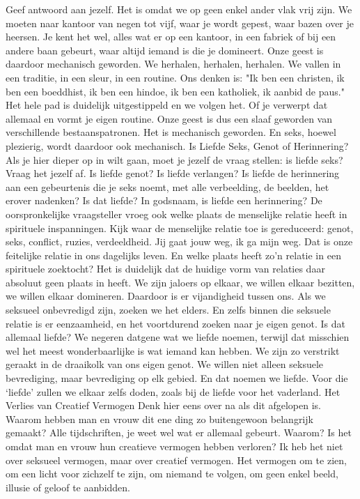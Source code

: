Geef antwoord aan jezelf. Het is omdat we op geen enkel ander vlak vrij zijn. We moeten naar kantoor van negen tot vijf, waar je wordt gepest, waar bazen over je heersen. Je kent het wel, alles wat er op een kantoor, in een fabriek of bij een andere baan gebeurt, waar altijd iemand is die je domineert.
Onze geest is daardoor mechanisch geworden. We herhalen, herhalen, herhalen. We vallen in een traditie, in een sleur, in een routine. Ons denken is: "Ik ben een christen, ik ben een boeddhist, ik ben een hindoe, ik ben een katholiek, ik aanbid de paus." Het hele pad is duidelijk uitgestippeld en we volgen het. Of je verwerpt dat allemaal en vormt je eigen routine. Onze geest is dus een slaaf geworden van verschillende bestaanspatronen. Het is mechanisch geworden.
En seks, hoewel plezierig, wordt daardoor ook mechanisch.
Is Liefde Seks, Genot of Herinnering?
Als je hier dieper op in wilt gaan, moet je jezelf de vraag stellen: is liefde seks? Vraag het jezelf af. Is liefde genot? Is liefde verlangen? Is liefde de herinnering aan een gebeurtenis die je seks noemt, met alle verbeelding, de beelden, het erover nadenken? Is dat liefde? In godsnaam, is liefde een herinnering?
De oorspronkelijke vraagsteller vroeg ook welke plaats de menselijke relatie heeft in spirituele inspanningen. Kijk waar de menselijke relatie toe is gereduceerd: genot, seks, conflict, ruzies, verdeeldheid. Jij gaat jouw weg, ik ga mijn weg. Dat is onze feitelijke relatie in ons dagelijks leven. En welke plaats heeft zo’n relatie in een spirituele zoektocht?
Het is duidelijk dat de huidige vorm van relaties daar absoluut geen plaats in heeft. We zijn jaloers op elkaar, we willen elkaar bezitten, we willen elkaar domineren. Daardoor is er vijandigheid tussen ons. Als we seksueel onbevredigd zijn, zoeken we het elders. En zelfs binnen die seksuele relatie is er eenzaamheid, en het voortdurend zoeken naar je eigen genot.
Is dat allemaal liefde? We negeren datgene wat we liefde noemen, terwijl dat misschien wel het meest wonderbaarlijke is wat iemand kan hebben. We zijn zo verstrikt geraakt in de draaikolk van ons eigen genot. We willen niet alleen seksuele bevrediging, maar bevrediging op elk gebied. En dat noemen we liefde. Voor die ‘liefde’ zullen we elkaar zelfs doden, zoals bij de liefde voor het vaderland.
Het Verlies van Creatief Vermogen
Denk hier eens over na als dit afgelopen is. Waarom hebben man en vrouw dit ene ding zo buitengewoon belangrijk gemaakt? Alle tijdschriften, je weet wel wat er allemaal gebeurt. Waarom?
Is het omdat man en vrouw hun creatieve vermogen hebben verloren? Ik heb het niet over seksueel vermogen, maar over creatief vermogen. Het vermogen om te zien, om een licht voor zichzelf te zijn, om niemand te volgen, om geen enkel beeld, illusie of geloof te aanbidden.
